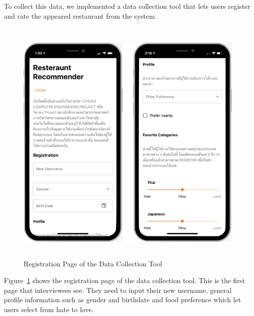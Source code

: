 \documentclass[12pt,oneside,openright,a4paper]{cpe-english-project}
\begin{document}
To collect this data, we implemented a data collection tool that lets users register and rate the appeared restaurant from the system.

\begin{figure}[H]\centering
\includegraphics[height=350pt]{./images/4RegistrationPageoftheDataCollectionTool.png}
\caption{Registration Page of the Data Collection Tool}\label{fig:4RegistrationPageoftheDataCollectionTool}
\end{figure}

Figure~\ref{fig:4RegistrationPageoftheDataCollectionTool} shows the registration page of the data collection tool. This is the first page that interviewees see. They need to input their new username, general profile information such as gender and birthdate and food preference which let users select from hate to love.
\end{document}
